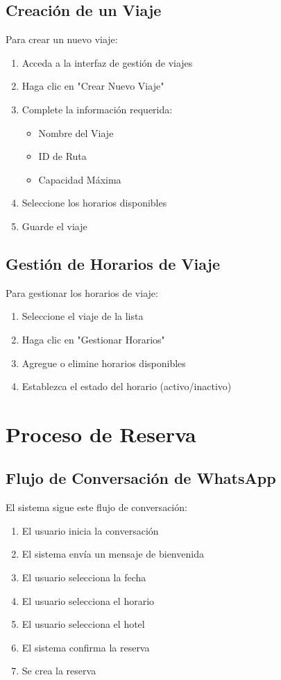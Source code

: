 \subsection{Creación de un Viaje}
Para crear un nuevo viaje:
\begin{enumerate}
    \item Acceda a la interfaz de gestión de viajes
    \item Haga clic en "Crear Nuevo Viaje"
    \item Complete la información requerida:
        \begin{itemize}
            \item Nombre del Viaje
            \item ID de Ruta
            \item Capacidad Máxima
        \end{itemize}
    \item Seleccione los horarios disponibles
    \item Guarde el viaje
\end{enumerate}

\subsection{Gestión de Horarios de Viaje}
Para gestionar los horarios de viaje:
\begin{enumerate}
    \item Seleccione el viaje de la lista
    \item Haga clic en "Gestionar Horarios"
    \item Agregue o elimine horarios disponibles
    \item Establezca el estado del horario (activo/inactivo)
\end{enumerate}

\section{Proceso de Reserva}

\subsection{Flujo de Conversación de WhatsApp}
El sistema sigue este flujo de conversación:
\begin{enumerate}
    \item El usuario inicia la conversación
    \item El sistema envía un mensaje de bienvenida
    \item El usuario selecciona la fecha
    \item El usuario selecciona el horario
    \item El usuario selecciona el hotel
    \item El sistema confirma la reserva
    \item Se crea la reserva
\end{enumerate}

